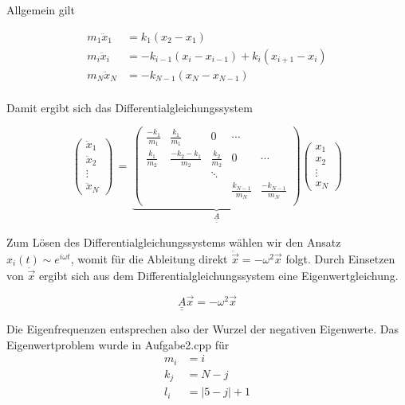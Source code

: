 \noindent
Allgemein gilt

\begin{align*}
  m_1\ddot{x}_1 &= k_1(x_2 - x_1) \\
  m_i\ddot{x}_i &= -k_{i-1} (x_i - x_{i-1}) + k_i(x_{i+1}-x_i) \\
  m_N\ddot{x}_N &= -k_{N-1}(x_N - x_{N-1}) \\
\end{align*}

\noindent
Damit ergibt sich das Differentialgleichungssystem

\begin{equation*}
  \left(\begin{array}{c} \ddot{x}_1 \\ \ddot{x}_2 \\ \vdots \\ \ddot{x}_N \end{array}\right)\, = \,
  \underbrace{\left(
        \begin{array}{ccccc}
          \frac{-k_1}{m_1} & \frac{k_1}{m_1} & 0 & \cdots & \\
          \frac{k_1}{m_2} & \frac{-k_2-k_1}{m_2} & \frac{k_2}{m_2} & 0 & \cdots \\
          & & \ddots & & \\
          & & & \frac{k_{N-1}}{m_N} & \frac{-k_{N-1}}{m_N}\\
        \end{array}\right)}_{\underline{\underline{A}}}
        \left(\begin{array}{c} x_1 \\ x_2 \\ \vdots \\ x_N \end{array}\right)
\end{equation*}

Zum Lösen des Differentialgleichungssystems wählen wir den Ansatz $x_i(t) \sim e^{i\omega t}$, womit für die Ableitung direkt $\ddot{\vec{x}} = -\omega^2 \vec{x}$ folgt. Durch Einsetzen von $\ddot{\vec{x}}$ ergibt sich aus dem Differentialgleichungssystem eine Eigenwertgleichung.

\begin{equation*}
  \underline{\underline{A}}\vec{x} = -\omega^2\vec{x}
\end{equation*}

\noindent
Die Eigenfrequenzen entsprechen also der Wurzel der negativen Eigenwerte. Das Eigenwertproblem wurde in Aufgabe2.cpp für
\begin{align*}
  m_i &= i \\
  k_j &= N-j \\
  l_i &= |5-j|+1
\end{align*}

